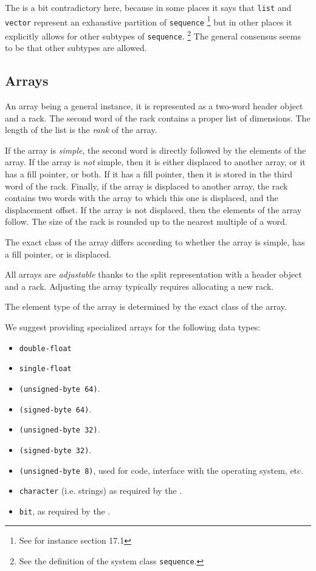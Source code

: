 The \hs{} is a bit contradictory here, because
in some places it says that \texttt{list} and \texttt{vector}
represent an exhaustive partition of \texttt{sequence}%
\footnote{See for instance section 17.1}
but in other places it explicitly allows for other subtypes of
\texttt{sequence}.%
\footnote{See the definition of the system class \texttt{sequence}.}
The general consensus seems to be that other subtypes are allowed.


\subsection{Arrays}
\label{sec-data-representation-arrays}

An array being a general instance, it is represented as a two-word
header object and a rack.  The second word of the rack
contains a proper list of dimensions.  The length of the list
is the \emph{rank} of the array.

If the array is \emph{simple}, the second word is directly followed
by the elements of the array.  If the array is \emph{not} simple, then
it is either displaced to another array, or it has a fill pointer, or
both.  If it has a fill pointer, then it is stored in the third word
of the rack.  Finally, if the array is displaced to another
array, the rack contains two words with the array to which
this one is displaced, and the displacement offset.  If the array is
not displaced, then the elements of the array follow.  The size of the
rack is rounded up to the nearest multiple of a word.

The exact class of the array differs according to whether the array is
simple, has a fill pointer, or is displaced.

All arrays are \emph{adjustable} thanks to the split representation
with a header object and a rack.  Adjusting the array
typically requires allocating a new rack.

The element type of the array is determined by the exact class of the
array.

We suggest providing specialized arrays for the following data types:

\begin{itemize}
\item \texttt{double-float}
\item \texttt{single-float}
\item \texttt{(unsigned-byte 64)}.
\item \texttt{(signed-byte 64)}.
\item \texttt{(unsigned-byte 32)}.
\item \texttt{(signed-byte 32)}.
\item \texttt{(unsigned-byte 8)}, used for code, interface with the
  operating system, etc.
\item \texttt{character} (i.e. strings) as required by the \hs{}.
\item \texttt{bit}, as required by the \hs{}.
\end{itemize}

